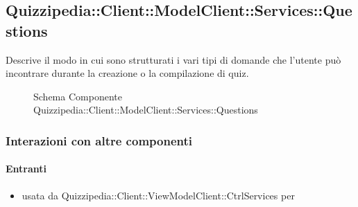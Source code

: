 \subsection{Quizzipedia::Client::ModelClient::Services::Questions}
Descrive il modo in cui sono strutturati i vari tipi di domande che l'utente può incontrare durante la creazione o la compilazione di quiz.
\begin{figure}[H]
\centering
\noindent{}
\caption[Schema Componente Quizzipedia::Client::ModelClient::Services::Questions]{Schema Componente Quizzipedia::Client::ModelClient::Services::Questions}
\end{figure}
\subsubsection{Interazioni con altre componenti}
\paragraph{Entranti}
\begin{itemize}
\item usata da Quizzipedia::Client::ViewModelClient::CtrlServices per 
\end{itemize}
